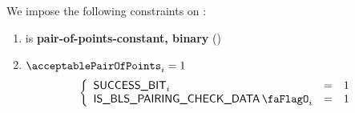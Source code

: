 We impose the following constraints on \acceptablePairOfPoints{}:
\begin{enumerate}
    \item \acceptablePairOfPoints{} is \textbf{pair-of-points-constant, binary} \quad (\trash)
    \item \If $\acceptablePairOfPoints_{i} = 1$ \Then
        \[
            \left\{ \begin{array}{lcl}
                \ecdataSuccessBit _{i}       & = & 1 \\
                \isBlsPairingCheckData  _{i} & = & 1 \\
            \end{array} \right.
        \]
\end{enumerate}
